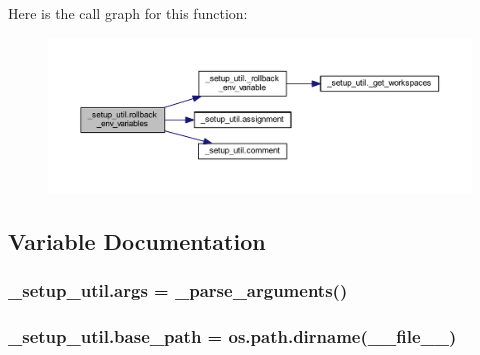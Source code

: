 Here is the call graph for this function\+:
\nopagebreak
\begin{figure}[H]
\begin{center}
\leavevmode
\includegraphics[width=350pt]{df/dc0/namespace__setup__util_af3030db6102b5aa35cd354a2fb6cca03_cgraph}
\end{center}
\end{figure}




\subsection{Variable Documentation}
\subsubsection[{\texorpdfstring{args}{args}}]{\setlength{\rightskip}{0pt plus 5cm}\+\_\+setup\+\_\+util.\+args = {\bf \+\_\+parse\+\_\+arguments}()}\hypertarget{namespace__setup__util_a547963d07c6371df1c51b1384a2dec28}{}\label{namespace__setup__util_a547963d07c6371df1c51b1384a2dec28}
\subsubsection[{\texorpdfstring{base\+\_\+path}{base_path}}]{\setlength{\rightskip}{0pt plus 5cm}\+\_\+setup\+\_\+util.\+base\+\_\+path = os.\+path.\+dirname(\+\_\+\+\_\+file\+\_\+\+\_\+)}\hypertarget{namespace__setup__util_a83d25140acd7788bbcb95843fe38e639}{}\label{namespace__setup__util_a83d25140acd7788bbcb95843fe38e639}
